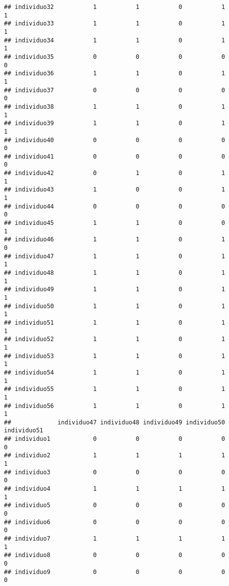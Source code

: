 \documentclass[
]{article}
\begin{document}
\begin{verbatim}
## individuo32           1           1           0           1           1
## individuo33           1           1           0           1           1
## individuo34           1           1           0           1           1
## individuo35           0           0           0           0           0
## individuo36           1           1           0           1           1
## individuo37           0           0           0           0           0
## individuo38           1           1           0           1           1
## individuo39           1           1           0           1           1
## individuo40           0           0           0           0           0
## individuo41           0           0           0           0           0
## individuo42           0           1           0           1           1
## individuo43           1           0           0           1           1
## individuo44           0           0           0           0           0
## individuo45           1           1           0           0           1
## individuo46           1           1           0           1           0
## individuo47           1           1           0           1           1
## individuo48           1           1           0           1           1
## individuo49           1           1           0           1           1
## individuo50           1           1           0           1           1
## individuo51           1           1           0           1           1
## individuo52           1           1           0           1           1
## individuo53           1           1           0           1           1
## individuo54           1           1           0           1           1
## individuo55           1           1           0           1           1
## individuo56           1           1           0           1           1
##             individuo47 individuo48 individuo49 individuo50 individuo51
## individuo1            0           0           0           0           0
## individuo2            1           1           1           1           1
## individuo3            0           0           0           0           0
## individuo4            1           1           1           1           1
## individuo5            0           0           0           0           0
## individuo6            0           0           0           0           0
## individuo7            1           1           1           1           1
## individuo8            0           0           0           0           0
## individuo9            0           0           0           0           0

\end{verbatim}
\end{document}
